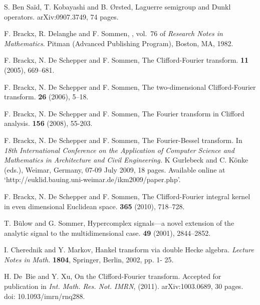 \documentclass{amsart}
\theoremstyle{remark}
\begin{document}
\begin{thebibliography}{99}

S. Ben Sa\"id, T. Kobayashi and B. {\O}rsted,
\newblock Laguerre semigroup and Dunkl operators.
\newblock arXiv:0907.3749, 74 pages.

F. Brackx, R. Delanghe and F. Sommen,
, vol.~76 of {\em Research Notes in
  Mathematics}.
\newblock Pitman (Advanced Publishing Program), Boston, MA, 1982.

F. Brackx, N. De Schepper and F. Sommen,
\newblock The Clifford-Fourier transform.
 {\bf 11} (2005), 669--681.

F. Brackx, N. De Schepper and F. Sommen,
\newblock The two-dimensional Clifford-Fourier transform.
 {\bf 26} (2006), 5--18.

F. Brackx, N. De Schepper and F. Sommen, 
\newblock The Fourier transform in Clifford analysis.
 \textbf{156} (2008), 55-203.

F. Brackx, N. De Schepper and F. Sommen,
\newblock The Fourier-Bessel transform.
In {\em 18th International Conference on the Application of Computer Science and Mathematics in Architecture and Civil Engineering.} K Gurlebeck and C. K\"onke (eds.), Weimar, Germany, 07-09 July 2009, 18 pages. Available online at `http://euklid.bauing.uni-weimar.de/ikm2009/paper.php'.

F. Brackx, N. De Schepper and F. Sommen,
\newblock The Clifford-Fourier integral kernel in even dimensional Euclidean space.
 {\bf 365} (2010), 718--728.

T. B{\"u}low and G. Sommer,
\newblock Hypercomplex signals---a novel extension of the analytic signal to
  the multidimensional case.
 {\bf 49} (2001), 2844--2852.

I. Cherednik and Y. Markov,
Hankel transform via double Hecke algebra.
{\em Lecture Notes in Math.} {\bf 1804}, Springer, Berlin, 2002, pp. 1- 25.

H. De~Bie and Y. Xu, 
\newblock On the Clifford-Fourier transform.
\newblock Accepted for publication in {\em Int. Math. Res. Not. IMRN}, (2011). arXiv:1003.0689, 30 pages. doi: 10.1093/imrn/rnq288.


\end{thebibliography}
\end{document}
